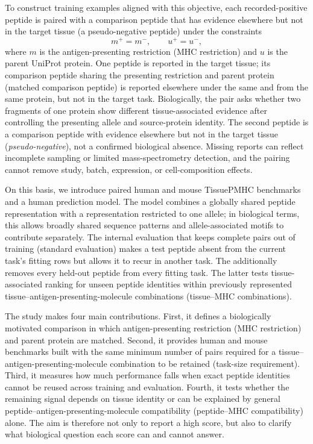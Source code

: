To construct training examples aligned with this objective, each recorded-positive peptide is paired with a comparison peptide that has evidence elsewhere but not in the target tissue (a pseudo-negative peptide) under the constraints
\[
m^{+}=m^{-}, \qquad u^{+}=u^{-},
\]
where \(m\) is the antigen-presenting restriction (MHC restriction) and \(u\) is the parent UniProt protein. One peptide is reported in the target tissue; its comparison peptide sharing the presenting restriction and parent protein (matched comparison peptide) is reported elsewhere under the same \plainMHC{} and from the same protein, but not in the target task. Biologically, the pair asks whether two fragments of one protein show different tissue-associated evidence after controlling the presenting allele and source-protein identity. The second peptide is a comparison peptide with evidence elsewhere but not in the target tissue (\emph{pseudo-negative}), not a confirmed biological absence. Missing reports can reflect incomplete sampling or limited mass-spectrometry detection, and the pairing cannot remove study, batch, expression, or cell-composition effects.

On this basis, we introduce paired human and mouse TissuePMHC benchmarks and a human prediction model. The model combines a globally shared peptide representation with a representation restricted to one \plainHLA{} allele; in biological terms, this allows broadly shared sequence patterns and allele-associated motifs to contribute separately. The internal evaluation that keeps complete pairs out of training (standard evaluation) makes a test peptide absent from the current task's fitting rows but allows it to recur in another task. The \plainPeptideOOF{} additionally removes every held-out peptide from every fitting task. The latter tests tissue-associated ranking for unseen peptide identities within previously represented tissue--antigen-presenting-molecule combinations (tissue--MHC combinations).

The study makes four main contributions. First, it defines a biologically motivated comparison in which antigen-presenting restriction (MHC restriction) and parent protein are matched. Second, it provides human and mouse benchmarks built with the same minimum number of pairs required for a tissue--antigen-presenting-molecule combination to be retained (task-size requirement). Third, it measures how much performance falls when exact peptide identities cannot be reused across training and evaluation. Fourth, it tests whether the remaining signal depends on tissue identity or can be explained by general peptide--antigen-presenting-molecule compatibility (peptide--MHC compatibility) alone. The aim is therefore not only to report a high score, but also to clarify what biological question each score can and cannot answer.
